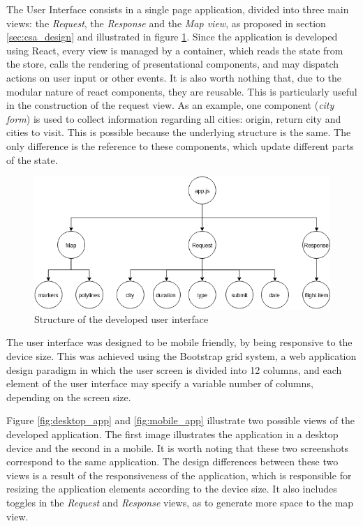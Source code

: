 The User Interface consists in a single page application, divided into three main views: the \textit{Request}, the \textit{Response} and the \textit{Map view}, as proposed in section \ref{sec:csa_design} and illustrated in figure \ref{fig:csa_tree}. Since the application is developed using React, every view is managed by a container, which reads the state from the store, calls the rendering of presentational components, and may dispatch actions on user input or other events. It is also worth nothing that, due to the modular nature of react components, they are reusable. This is particularly useful in the construction of the request view. As an example, one component (\textit{city form}) is used to collect information regarding all cities: origin, return city and cities to visit. This is possible because the underlying structure is the same. The only difference is the reference to these components, which update different parts of the state.  

\begin{figure}[htpb]
  \centering
  \includegraphics[width=.8\textwidth]{./Figures/system_implementation/csa_tree.png}
  \caption{Structure of the developed user interface}
  \label{fig:csa_tree}  
\end{figure}

The user interface was designed to be mobile friendly, by being responsive to the device size. This was achieved using the Bootstrap grid system, a web application design paradigm in which the user screen is divided into 12 columns, and each element of the user interface may specify a variable number of columns, depending on the screen size.

Figure \ref{fig:desktop_app} and \ref{fig:mobile_app} illustrate two possible views of the developed application. The first image illustrates the application in a desktop device and the second in a mobile. It is worth noting that these two screenshots correspond to the same application. The design differences between these two views is a result of the responsiveness of the application, which is responsible for resizing the application elements according to the device size. It also includes toggles in the \textit{Request} and \textit{Response} views, as to generate more space to the map view. 


